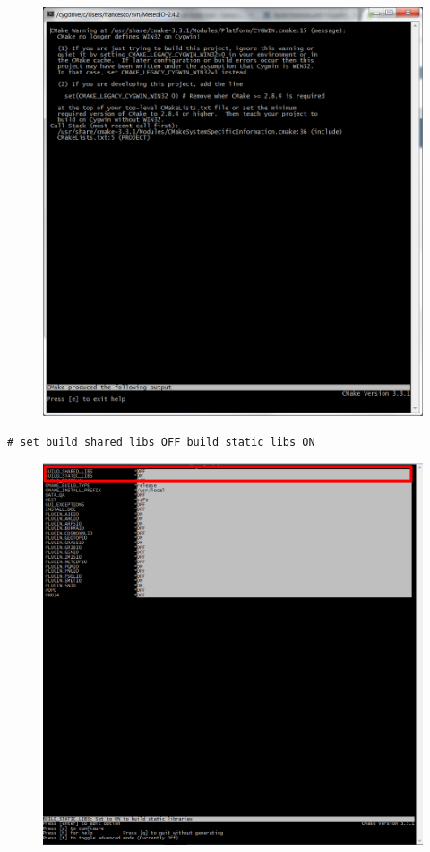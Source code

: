 \begin{figure}[h]
  \includegraphics[width=\linewidth]{2015/Aug/25/9pic.png}
\end{figure}

\pagebreak

\begin{lstlisting}[style=bashStyle]
# set build_shared_libs OFF build_static_libs ON
\end{lstlisting}

\begin{figure}[h]
  \includegraphics[width=\linewidth]{2015/Aug/25/10pic.png}
\end{figure}

